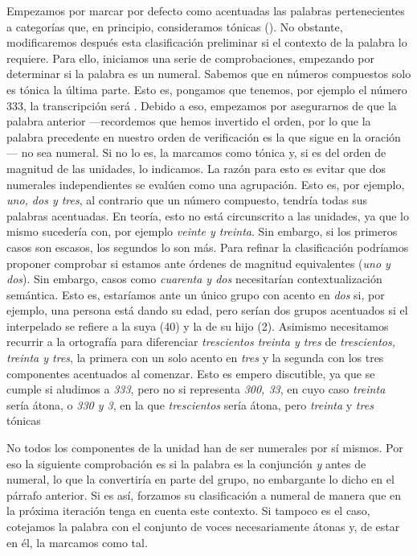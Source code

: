 Empezamos por marcar por defecto como acentuadas las palabras pertenecientes a categorías que, en principio, consideramos tónicas (). No obstante, modificaremos después esta clasificación preliminar si el contexto de la palabra lo requiere. Para ello, iniciamos una serie de comprobaciones, empezando por determinar si la palabra es un numeral. Sabemos que en números compuestos solo es tónica la última parte. Esto es, pongamos que tenemos, por ejemplo el número 333, la transcripción será . Debido a eso, empezamos por asegurarnos de que la palabra anterior —recordemos que hemos invertido el orden, por lo que la palabra precedente en nuestro orden de verificación es la que sigue en la oración— no sea numeral. Si no lo es, la marcamos como tónica y, si es del orden de magnitud de las unidades, lo indicamos. La razón para esto es evitar que dos numerales independientes se evalúen como una agrupación. Esto es, por ejemplo, \textit{uno, dos y tres}, al contrario que un número compuesto, tendría todas sus palabras acentuadas. En teoría, esto no está circunscrito a las unidades, ya que lo mismo sucedería con, por ejemplo \textit{veinte y treinta}. Sin embargo, si los primeros casos son escasos, los segundos lo son más. Para refinar la clasificación podríamos proponer comprobar si estamos ante órdenes de magnitud equivalentes (\textit{uno y dos}). Sin embargo, casos como \textit{cuarenta y dos} necesitarían contextualización semántica. Esto es, estaríamos ante un único grupo con acento en \textit{dos} si, por ejemplo, una persona está dando su edad, pero serían dos grupos acentuados si el interpelado se refiere a la suya (40) y la de su hijo (2). Asimismo necesitamos recurrir a la ortografía para diferenciar \textit{trescientos treinta y tres} de \textit{trescientos, treinta y tres}, la primera con un solo acento en \textit{tres} y la segunda con los tres componentes acentuados al comenzar. Esto es empero discutible, ya que se cumple si aludimos a \textit{333}, pero no si representa \textit{300, 33}, en cuyo caso \textit{treinta} sería átona, o  \textit{330 y 3}, en la que \textit{trescientos} sería átona, pero \textit{treinta} y \textit{tres} tónicas

No todos los componentes de la unidad han de ser numerales por sí mismos. Por eso la siguiente comprobación es si la palabra es la conjunción \textit{y} antes de numeral, lo que la convertiría en parte del grupo, no embargante lo dicho en el párrafo anterior. Si es así, forzamos su clasificación a numeral de manera que en la próxima iteración tenga en cuenta este contexto. Si tampoco es el caso, cotejamos la palabra con el conjunto de voces necesariamente átonas y, de estar en él, la marcamos como tal. 
 
